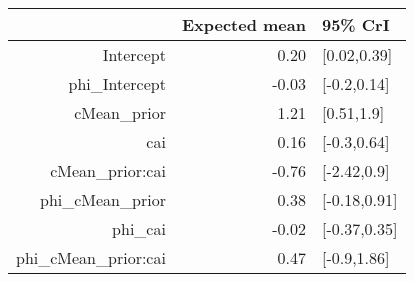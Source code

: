 \begin{tabular}{rrl}
  \hline
 & Expected mean & 95\% CrI \\ 
  \hline
Intercept & 0.20 & [0.02,0.39] \\ 
  phi\_Intercept & -0.03 & [-0.2,0.14] \\ 
  cMean\_prior & 1.21 & [0.51,1.9] \\ 
  cai & 0.16 & [-0.3,0.64] \\ 
  cMean\_prior:cai & -0.76 & [-2.42,0.9] \\ 
  phi\_cMean\_prior & 0.38 & [-0.18,0.91] \\ 
  phi\_cai & -0.02 & [-0.37,0.35] \\ 
  phi\_cMean\_prior:cai & 0.47 & [-0.9,1.86] \\ 
   \hline
\end{tabular}

